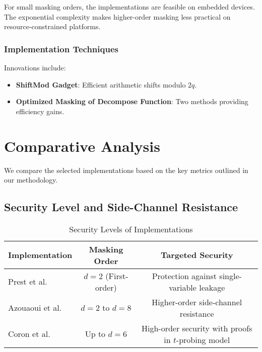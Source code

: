For small masking orders, the implementations are feasible on embedded devices. The exponential complexity makes higher-order masking less practical on resource-constrained platforms.

\subsubsection{Implementation Techniques}

Innovations include:

\begin{itemize}
    \item \textbf{ShiftMod Gadget}: Efficient arithmetic shifts modulo $2q$.
    \item \textbf{Optimized Masking of Decompose Function}: Two methods providing efficiency gains.
\end{itemize}

\section{Comparative Analysis}

We compare the selected implementations based on the key metrics outlined in our methodology.

\subsection{Security Level and Side-Channel Resistance}

\begin{table}[h]
    \centering
    \caption{Security Levels of Implementations}
    \begin{tabular}{lcc}
        \toprule
        \textbf{Implementation} & \textbf{Masking Order} & \textbf{Targeted Security}                           \\
        \midrule
        Prest et al.\           & $d = 2$ (First-order)  & Protection against single-variable leakage           \\
        Azouaoui et al.\        & $d = 2$ to $d = 8$     & Higher-order side-channel resistance                 \\
        Coron et al.\           & Up to $d = 6$          & High-order security with proofs in $t$-probing model \\
        \bottomrule
    \end{tabular}
    \label{tab:security_levels}
\end{table}

